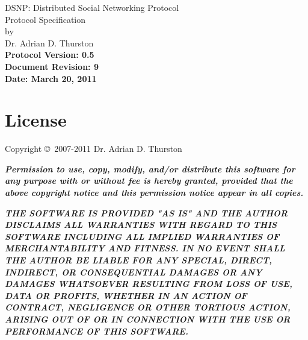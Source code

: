 \documentclass[letterpaper,11pt,oneside]{article}
\begin{document}
%
%

\thispagestyle{empty}
\begin{center}
{\huge DSNP: Distributed Social Networking Protocol}\\
\vspace*{12pt}
{\Large Protocol Specification}\\
\vspace{12pt}
by\\
\vspace{12pt}
{\large Dr. Adrian D. Thurston}\\
\vspace{22pt}
{\noindent\bf\large Protocol Version: 0.5}\\
\vspace{6pt}
{\noindent\bf\large Document Revision: 9}\\
\vspace{6pt}
{\noindent\bf\large Date: March 20, 2011}
\end{center}


\vspace{1.3in}

\section*{License}

Copyright \copyright\ 2007-2011 Dr. Adrian D. Thurston

\vspace{5pt}

{\bf\it\noindent Permission to use, copy, modify, and/or distribute this
software for any purpose with or without fee is hereby granted, provided that
the above copyright notice and this permission notice appear in all copies.}

\vspace{5pt}

{\bf\it\noindent
THE SOFTWARE IS PROVIDED "AS IS" AND THE AUTHOR DISCLAIMS ALL WARRANTIES
WITH REGARD TO THIS SOFTWARE INCLUDING ALL IMPLIED WARRANTIES OF
MERCHANTABILITY AND FITNESS. IN NO EVENT SHALL THE AUTHOR BE LIABLE FOR
ANY SPECIAL, DIRECT, INDIRECT, OR CONSEQUENTIAL DAMAGES OR ANY DAMAGES
WHATSOEVER RESULTING FROM LOSS OF USE, DATA OR PROFITS, WHETHER IN AN
ACTION OF CONTRACT, NEGLIGENCE OR OTHER TORTIOUS ACTION, ARISING OUT OF
OR IN CONNECTION WITH THE USE OR PERFORMANCE OF THIS SOFTWARE.}

\vspace{1.5in}
\end{document}
